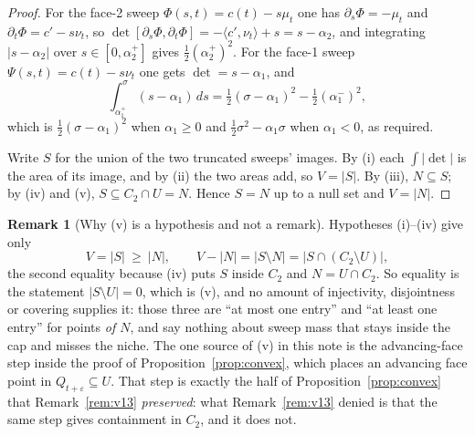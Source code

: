 \documentclass[11pt]{article}
\theoremstyle{definition}
\newtheorem{remark}[theorem]{Remark}
\begin{document}
\begin{proof}
For the face-2 sweep $\Phi(s,t)=c(t)-s\mu_t$ one has
$\partial_s\Phi=-\mu_t$ and $\partial_t\Phi=c'-s\nu_t$, so
$\det[\partial_s\Phi,\partial_t\Phi]=-\langle c',\nu_t\rangle+s=s-\alpha_2$, and
integrating $|s-\alpha_2|$ over $s\in[0,\alpha_2^+]$ gives
$\tfrac12(\alpha_2^+)^2$. For the face-1 sweep $\Psi(s,t)=c(t)-s\nu_t$ one gets
$\det=s-\alpha_1$, and
\[
  \int_{\alpha_1^+}^{\sigma}(s-\alpha_1)\,ds
  =\tfrac12(\sigma-\alpha_1)^2-\tfrac12(\alpha_1^-)^2 ,
\]
which is $\tfrac12(\sigma-\alpha_1)^2$ when $\alpha_1\ge0$ and
$\tfrac12\sigma^2-\alpha_1\sigma$ when $\alpha_1<0$, as required.

Write $S$ for the union of the two truncated sweeps' images. By (i) each $\int|\det|$ is the
area of its image, and by (ii) the two areas add, so $V=|S|$. By (iii), $N\subseteq S$; by
(iv) and (v), $S\subseteq C_2\cap U=N$. Hence $S=N$ up to a null set and $V=|N|$.
\end{proof}

\begin{remark}[Why (v) is a hypothesis and not a remark]\label{rem:Vfifth}
Hypotheses (i)--(iv) give only
\[
  V=|S|\ \ge\ |N| ,\qquad V-|N|=|S\setminus N|=\bigl|S\cap(C_2\setminus U)\bigr| ,
\]
the second equality because (iv) puts $S$ inside $C_2$ and $N=U\cap C_2$. So equality is the
statement $|S\setminus U|=0$, which is (v), and no amount of injectivity, disjointness or
covering supplies it: those three are ``at most one entry'' and ``at least one entry'' for
points \emph{of $N$}, and say nothing about sweep mass that stays inside the cap and misses
the niche. The one source of (v) in this note is the advancing-face step inside the proof of
Proposition~\ref{prop:convex}, which places an advancing face point in
$Q_{t+\varepsilon}\subseteq U$. That step is exactly the half of Proposition~\ref{prop:convex}
that Remark~\ref{rem:v13} \emph{preserved}: what Remark~\ref{rem:v13} denied is that the same
step gives containment in $C_2$, and it does not.
\end{remark}
\end{document}
